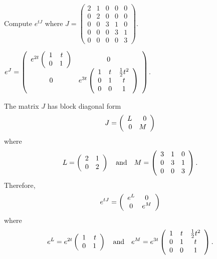 \documentclass{ximera}
\begin{document}
\begin{exercise}  \label{c10.5.5B}
Compute $e^{tJ}$ where $J=\left(\begin{array}{rrrrr} 2 & 1 & 0 & 0 & 0\\  
0 & 2 & 0 & 0 & 0 \\ 0 & 0 & 3 & 1 & 0\\ 0 & 0 & 0 & 3 & 1\\
0 & 0 & 0 & 0 & 3 \end{array}\right)$.

\begin{solution}
\ans $e^J = 
\left(\begin{array}{cc} e^{2t}\left(\begin{array}{rr} 1 & t\\ 0 &1\end{array}\right) & 0\\ 0 &e^{3t}\left(\begin{array}{ccc} 1 & t & \frac{1}{2}t^2 \\ 0 & 1 & t \\ 0 & 0 & 1\end{array}\right)\end{array}\right)$.

\soln  The matrix $J$ has block diagonal form 
\[
J = \left(\begin{array}{rr} L & 0\\ 0 &M\end{array}\right)
\]
where
\[
L = \left(\begin{array}{rr} 2 & 1\\ 0 &2\end{array}\right) \quad\mbox{and}\quad M = \left(\begin{array}{rrr} 3 & 1 & 0 \\ 0 & 3 & 1 \\ 0 & 0 & 3\end{array}\right).
\]
Therefore,
\[
e^{tJ} = \left(\begin{array}{cc} e^L & 0\\ 0 &e^M\end{array}\right)
\]
where
\[
e^L = e^{2t}\left(\begin{array}{rr} 1 & t\\ 0 &1\end{array}\right) \quad\mbox{and}\quad 
e^M = e^{3t}\left(\begin{array}{ccc} 1 & t & \frac{1}{2}t^2 \\ 0 & 1 & t \\ 0 & 0 & 1\end{array}\right).
\]


\end{solution}
\end{exercise}
\end{document}
